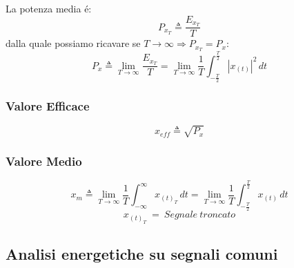             La potenza media é:
            \[
                P_{x_{T}} \triangleq \frac{E_{x_{T}}}{T}    
            \]
            dalla quale possiamo ricavare se $T \rightarrow \infty \Rightarrow P_{x_{T}} = P_{x}$:
            \[
                P_{x} \triangleq \lim_{T\rightarrow\infty} \frac{E_{x_{T}}}{T} =\lim_{T\rightarrow\infty} \frac{1}{T} \int_{-\frac{T}{2}}^{\frac{T}{2}}  |x_{(t)}|^2 \,dt    
            \]  
        \subsubsection{Valore Efficace}\label{Valore Efficace}
                \[    
                    x_{eff} \triangleq \sqrt{P_{x}}
                \]
        
        \subsubsection{Valore Medio}\label{Valore medio}

                    \[
                        x_{m} \triangleq \lim_{T\rightarrow\infty} \frac{1}{T} \int_{-\infty}^{\infty}  x_{(t)_T} \,dt = \lim_{T\rightarrow\infty} \frac{1}{T} \int_{-\frac{T}{2}}^{\frac{T}{2}}  x_{(t)} \,dt 
                    \]
                    \[
                        x_{(t)_T}\ =\ Segnale\ troncato
                    \]
                    
    \subsection{Analisi energetiche su segnali comuni}
